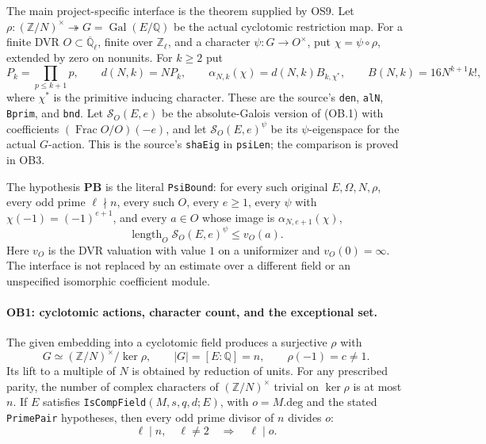 The main project-specific interface is the theorem supplied by OS9.  Let
$\rho:(\mathbb Z/N)^\times\twoheadrightarrow G=\operatorname{Gal}(E/\mathbb Q)$
be the actual cyclotomic restriction map.  For a finite DVR
$O\subset\overline{\mathbb Q}_\ell$, finite over $\mathbb Z_\ell$,
and a character $\psi:G\to O^\times$, put
$\chi=\psi\circ\rho$, extended by zero on nonunits.  For $k\ge2$ put
\[
 P_k=\prod_{p\le k+1}p,\qquad d(N,k)=NP_k,\qquad
 \alpha_{N,k}(\chi)=d(N,k)B_{k,\chi^*},\qquad
 B(N,k)=16N^{k+1}k!,                         \tag{OB.3}
\]
where $\chi^*$ is the primitive inducing character.  These are the
source's \texttt{den}, \texttt{alN}, \texttt{Bprim}, and \texttt{bnd}.
Let $\mathcal S_{O}(E,e)$ be the absolute-Galois version of (OB.1)
with coefficients $(\operatorname{Frac}O/O)(-e)$, and let
$\mathcal S_O(E,e)^\psi$ be its $\psi$-eigenspace for the actual
$G$-action.  This is the source's \texttt{shaEig} in
\texttt{psiLen}; the comparison is proved in OB3.

The hypothesis \textbf{PB} is the literal \texttt{PsiBound}:
for every such original $E,\Omega,N,\rho$, every odd prime
$\ell\nmid n$, every such $O$, every $e\ge1$, every $\psi$ with
$\chi(-1)=(-1)^{e+1}$, and every $a\in O$ whose image is
$\alpha_{N,e+1}(\chi)$,
\[
       \operatorname{length}_O\mathcal S_O(E,e)^\psi
                         \le v_O(a).                \tag{OB.4}
\]
Here $v_O$ is the DVR valuation with value $1$ on a uniformizer and
$v_O(0)=\infty$.  The interface is not replaced by an estimate over
a different field or an unspecified isomorphic coefficient module.

\paragraph{OB1: cyclotomic actions, character count, and the exceptional set.}
\label{claim:OB1}
The given embedding into a cyclotomic field produces a surjective
$\rho$ with
\[
 G\simeq(\mathbb Z/N)^\times/\ker\rho,
 \qquad |G|=[E:\mathbb Q]=n,
 \qquad \rho(-1)=c\ne1.                         \tag{OB.5}
\]
Its lift to a multiple of $N$ is obtained by reduction of units.
For any prescribed parity, the number of complex characters of
$(\mathbb Z/N)^\times$ trivial on $\ker\rho$ is at most $n$.
If $E$ satisfies \texttt{IsCompField}$(M,s,q,d;E)$, with
$o=M.\mathrm{deg}$ and the stated \texttt{PrimePair} hypotheses,
then every odd prime divisor of $n$ divides $o$:
\[
                 \ell\mid n,\quad\ell\ne2
                       \quad\Longrightarrow\quad\ell\mid o.
 \tag{OB.6}
\]

